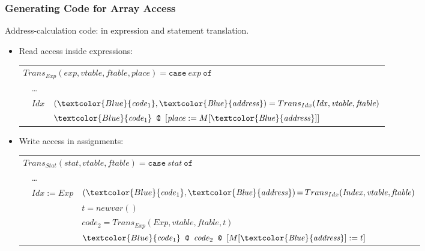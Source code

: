 \documentclass{beamer}
\newcommand{\blue}[1]{\textcolor{Blue}{{#1}}}
\renewcommand{\emph}[1]{\textcolor{structure}{#1}}
\begin{document}
\begin{frame}[t]
	\frametitle{Generating Code for Array Access}

Address-calculation code: in expression and statement translation.

\bigskip

\begin{itemize}
\item \emph{Read access} inside expressions:

\medskip
{\footnotesize 
\begin{tabular}{lll}
\multicolumn{3}{l}{$Trans_{Exp}(\mathit{exp},\mathit{vtable},\mathit{ftable},\mathit{place})
 = \mathtt{case}~\mathit{exp}~\mathtt{of}$} \\
& \ldots &\\\hline
& $\mathit{Idx}$
        & $(\blue{\mathit{code}_1},\mathit{\blue{address}}) = Trans_{Idx} (\mathit{Idx},\mathit{vtable},\mathit{ftable})$ \\
&       & $\blue{\mathit{code}_1} \concat [\mathit{place} := M[\mathit{\blue{address}}]]$ \\\hline
\end{tabular}
}

\bigskip
\item \emph{Write access} in assignments:

\medskip
{\footnotesize 
\begin{tabular}{lll}
\multicolumn{3}{l}{$Trans_{Stat}(\mathit{stat},\mathit{vtable},\mathit{ftable})
 = \mathtt{case}~\mathit{stat}~\mathtt{of}$} \\
& \ldots &\\\hline
& $\mathit{Idx} := \mathit{Exp}$
        & $(\blue{\mathit{code}_1},\mathit{\blue{address}}) \,{=}\, Trans_{Idx}(\mathit{Index},\mathit{vtable},\mathit{ftable})$ \\
&        & $t = \mathit{newvar}()$ \\
&        & $\mathit{code}_2 = Trans_{Exp}(\mathit{Exp},\mathit{vtable},\mathit{ftable},t)$ \\
&        & $\blue{\mathit{code}_1} \concat \mathit{code}_2 \concat [M[\mathit{\blue{address}}] := t]$ \\\hline
\end{tabular}
}

\end{itemize}

\end{frame}
\end{document}
